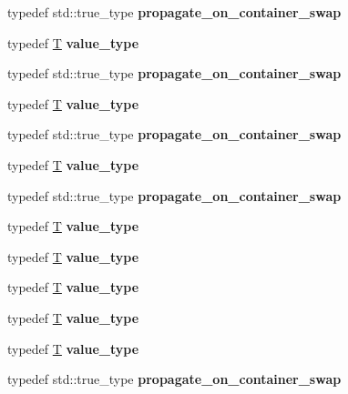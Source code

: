 \begin{DoxyCompactItemize}
typedef std\+::true\+\_\+type {\bfseries propagate\+\_\+on\+\_\+container\+\_\+swap}
\item 
\mbox{\label{structsome__alloc_a41022544a2b3ffeb4ffce92f759eb30b}} 
typedef \mbox{\hyperlink{struct_t}{T}} {\bfseries value\+\_\+type}
\item 
\mbox{\label{structsome__alloc_aad61c49c6ad5f1ca6dfb3f5d38d70d57}} 
typedef std\+::true\+\_\+type {\bfseries propagate\+\_\+on\+\_\+container\+\_\+swap}
\item 
\mbox{\label{structsome__alloc_a41022544a2b3ffeb4ffce92f759eb30b}} 
typedef \mbox{\hyperlink{struct_t}{T}} {\bfseries value\+\_\+type}
\item 
\mbox{\label{structsome__alloc_aad61c49c6ad5f1ca6dfb3f5d38d70d57}} 
typedef std\+::true\+\_\+type {\bfseries propagate\+\_\+on\+\_\+container\+\_\+swap}
\item 
\mbox{\label{structsome__alloc_a41022544a2b3ffeb4ffce92f759eb30b}} 
typedef \mbox{\hyperlink{struct_t}{T}} {\bfseries value\+\_\+type}
\item 
\mbox{\label{structsome__alloc_aad61c49c6ad5f1ca6dfb3f5d38d70d57}} 
typedef std\+::true\+\_\+type {\bfseries propagate\+\_\+on\+\_\+container\+\_\+swap}
\item 
\mbox{\label{structsome__alloc_a41022544a2b3ffeb4ffce92f759eb30b}} 
typedef \mbox{\hyperlink{struct_t}{T}} {\bfseries value\+\_\+type}
\item 
\mbox{\label{structsome__alloc_a41022544a2b3ffeb4ffce92f759eb30b}} 
typedef \mbox{\hyperlink{struct_t}{T}} {\bfseries value\+\_\+type}
\item 
\mbox{\label{structsome__alloc_a41022544a2b3ffeb4ffce92f759eb30b}} 
typedef \mbox{\hyperlink{struct_t}{T}} {\bfseries value\+\_\+type}
\item 
\mbox{\label{structsome__alloc_a41022544a2b3ffeb4ffce92f759eb30b}} 
typedef \mbox{\hyperlink{struct_t}{T}} {\bfseries value\+\_\+type}
\item 
\mbox{\label{structsome__alloc_a41022544a2b3ffeb4ffce92f759eb30b}} 
typedef \mbox{\hyperlink{struct_t}{T}} {\bfseries value\+\_\+type}
\item 
\mbox{\label{structsome__alloc_aad61c49c6ad5f1ca6dfb3f5d38d70d57}} 
typedef std\+::true\+\_\+type {\bfseries propagate\+\_\+on\+\_\+container\+\_\+swap}
\end{DoxyCompactItemize}
